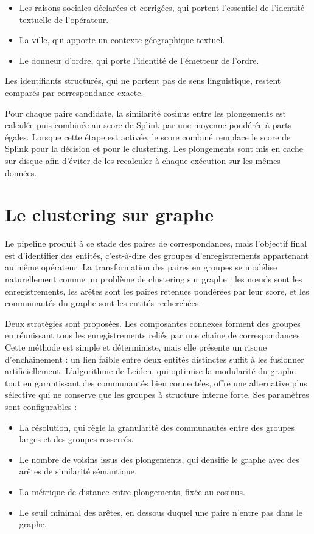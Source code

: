\begin{itemize}
    \item Les raisons sociales déclarées et corrigées, qui portent l'essentiel de l'identité textuelle de l'opérateur.
    \item La ville, qui apporte un contexte géographique textuel.
    \item Le donneur d'ordre, qui porte l'identité de l'émetteur de l'ordre.
\end{itemize}

\noindent Les identifiants structurés, qui ne portent pas de sens linguistique, restent comparés par correspondance exacte.

Pour chaque paire candidate, la similarité cosinus entre les plongements est calculée puis combinée au score de Splink par une moyenne pondérée à parts égales. Lorsque cette étape est activée, le score combiné remplace le score de Splink pour la décision et pour le clustering. Les plongements sont mis en cache sur disque afin d'éviter de les recalculer à chaque exécution sur les mêmes données.

\section{Le clustering sur graphe}

Le pipeline produit à ce stade des paires de correspondances, mais l'objectif final est d'identifier des entités, c'est-à-dire des groupes d'enregistrements appartenant au même opérateur. La transformation des paires en groupes se modélise naturellement comme un problème de clustering sur graphe : les nœuds sont les enregistrements, les arêtes sont les paires retenues pondérées par leur score, et les communautés du graphe sont les entités recherchées.

Deux stratégies sont proposées. Les composantes connexes forment des groupes en réunissant tous les enregistrements reliés par une chaîne de correspondances. Cette méthode est simple et déterministe, mais elle présente un risque d'enchaînement : un lien faible entre deux entités distinctes suffit à les fusionner artificiellement. L'algorithme de Leiden, qui optimise la modularité du graphe tout en garantissant des communautés bien connectées, offre une alternative plus sélective qui ne conserve que les groupes à structure interne forte. Ses paramètres sont configurables :

\begin{itemize}
    \item La résolution, qui règle la granularité des communautés entre des groupes larges et des groupes resserrés.
    \item Le nombre de voisins issus des plongements, qui densifie le graphe avec des arêtes de similarité sémantique.
    \item La métrique de distance entre plongements, fixée au cosinus.
    \item Le seuil minimal des arêtes, en dessous duquel une paire n'entre pas dans le graphe.
\end{itemize}

